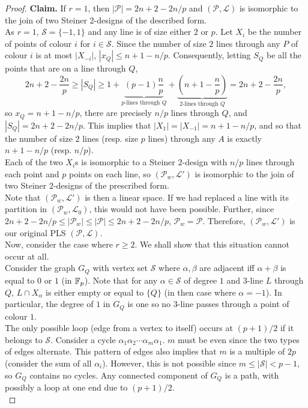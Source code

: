 \begin{proof}
		\textbf{Claim.} If $r = 1$, then $|\mathcal{P}| = 2n+2-2n/p$ and $(\mathcal{P},\mathcal{L})$ is isomorphic to the join of two Steiner 2-designs of the described form.\\
		As $r=1$, $\mathcal{S} = \{-1,1\}$ and any line is of size either $2$ or $p$. Let $X_i$ be the number of points of colour $i$ for $i \in \mathcal{S}$. Since the number of size $2$ lines through any $P$ of colour $i$ is at most $|X_{-i}|$, $|x_Q| \le n+1-n/p$. Consequently, letting $S_Q$ be all the points that are on a line through $Q$,
		\[ 2n+2-\frac{2n}{p} \ge |S_Q| \ge 1 + \underbrace{(p-1) \frac{n}{p}}_{\text{$p$-lines through $Q$}} + \underbrace{\left(n+1-\frac{n}{p}\right)}_{\text{$2$-lines through $Q$}} = 2n+2-\frac{2n}{p},  \]
		so $x_Q = n+1-n/p$, there are precisely $n/p$ lines through $Q$, and $|S_Q| = 2n+2-2n/p$. This implies that $|X_1| = |X_{-1}| = n+1-n/p$, and so that the number of size $2$ lines (resp. size $p$ lines) through any $A$ is exactly $n+1-n/p$ (resp. $n/p$).\\
		Each of the two $X_i$s is isomorphic to a Steiner $2$-design with $n/p$ lines through each point and $p$ points on each line, so $(\mathcal{P}_w,\mathcal{L}')$ is isomorphic to the join of two Steiner $2$-designs of the prescribed form.\\
		Note that $(\mathcal{P}_w,\mathcal{L}')$ is then a linear space. If we had replaced a line with its partition in $(\mathcal{P}_w,\mathcal{L}_0)$, this would not have been possible. %
		Further, since $2n+2-2n/p \le |\mathcal{P}_w| \le |\mathcal{P}| \le 2n+2-2n/p$, $\mathcal{P}_w = \mathcal{P}$. Therefore, $(\mathcal{P}_w,\mathcal{L}')$ is our original PLS $(\mathcal{P},\mathcal{L})$. \qedwhite\\

		Now, consider the case where $r\ge2$. We shall show that this situation cannot occur at all.\\ 
		Consider the graph $G_Q$ with vertex set $\mathcal{S}$ where $\alpha,\beta$ are adjacent iff $\alpha+\beta$ is equal to $0$ or $1$ (in $\mathbb{F}_p$). Note that for any $\alpha \in \mathcal{S}$ of degree $1$ and $3$-line $L$ through $Q$, $L \cap X_\alpha$ is either empty or equal to $\{Q\}$ (in then case where $\alpha = -1$). In particular, the degree of $1$ in $G_Q$ is one so no $3$-line passes through a point of colour $1$.\\
		The only possible loop (edge from a vertex to itself) occurs at $(p+1)/2$ if it belongs to $\mathcal{S}$. Consider a cycle $\alpha_1\alpha_2\cdots\alpha_m\alpha_1$. $m$ must be even since the two types of edges alternate. This pattern of edges also implies that $m$ is a multiple of $2p$ (consider the sum of all $\alpha_i$). However, this is not possible since $m \le |\mathcal{S}| < p-1$, so $G_Q$ contains no cycles. Any connected component of $G_Q$ is a path, with possibly a loop at one end due to $(p+1)/2$.\\


\end{proof}
